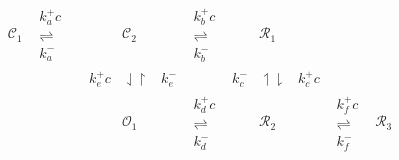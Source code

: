 \documentclass{article}
\def\C{\mathcal{C}}
\def\O{\mathcal{O}}
\def\R{\mathcal{R}}
\begin{document}
\[
\begin{array}{ccccccccccccc} \C_{1} & \begin{array}{c} { k^+_a c} \\ \rightleftharpoons \\ {k^-_a}
\end{array}& & & \C_{2} & &
\begin{array}{c} { k^+_b c }\\ \rightleftharpoons \\ {k^-_b}
\end{array} &&  \R_{1} && &  \\ &&& k^+_e c &
\downharpoonleft \upharpoonright & k^-_e & & k^-_c & \upharpoonleft
\downharpoonright & k^+_c c & &\\ && & &
\O_{1} & & \begin{array}{c} { k^+_d c}\\ \rightleftharpoons \\ {k^-_d} \end{array} & & \R_{2} & & \begin{array}{c} { k^+_f c }\\ \rightleftharpoons \\ {k^-_f}
\end{array} & \R_{3}  \\ 
\end{array}
\]
\end{document}

